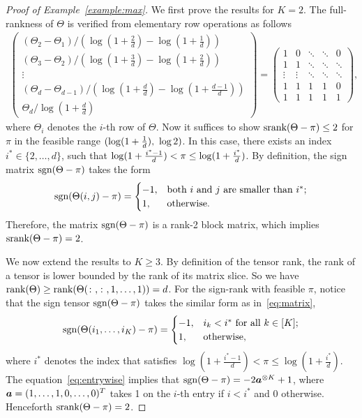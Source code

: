 \documentclass[twoside,11pt]{article}
\theoremstyle{definition}
\def\sign{\textup{sgn}}
\def\srank{\textup{srank}}
\def\rank{\textup{rank}}
\begin{document}
\begin{proof}[Proof of Example~\ref{example:max}]
We first prove the results for $K=2$. The full-rankness of $\Theta$ is verified from elementary row operations as follows
\begin{align}
\begin{pmatrix}
(\Theta_2-\Theta_1)/(\log(1+\frac{2}{d})-\log(1+\frac{1}{d}))\\(\Theta_3-\Theta_2)/(\log(1+\frac{3}{d})-\log(1+\frac{2}{d}))\\\vdots\\ (\Theta_d-\Theta_{d-1})/(\log(1+\frac{d}{d})-\log(1+\frac{d-1}{d}))\\\Theta_d/\log(1+\frac{d}{d})
\end{pmatrix} = \begin{pmatrix}
 1&          0  &      \ddots  &        \ddots       &          0 \\
1& 1 & \ddots &            \ddots   &   \ddots          \\
      \vdots &     \vdots & \ddots &       \ddots &    \ddots         \\
 1 & 1 &1 & 1 &0\\
 1 & 1 &1 & 1 &1
\end{pmatrix},
\end{align}
where $\Theta_i$ denotes the $i$-th row of $\Theta$. 
Now it suffices to show $\srank(\Theta-\pi)\leq 2$ for $\pi$ in the feasible range $(\log(1+{1\over d}),\ \log 2)$. In this case, there exists an index $i^*\in\{2,\ldots,d\}$, such that $\log(1+{i^*-1\over d})< \pi\leq \log(1+{i^*\over d})$. By definition, the sign matrix $\sign (\Theta-\pi)$ takes the form
\begin{equation}\label{eq:matrix}
\sign (\Theta(i,j)-\pi)=
\begin{cases}
-1, & \text{both $i$ and $j$ are smaller than $i^*$};\\
1, & \text{otherwise}.
\end{cases}
\end{equation}
Therefore, the matrix $\sign (\Theta-\pi)$ is a rank-2 block matrix, which implies $\srank(\Theta-\pi)=2$. 

We now extend the results to $K\geq 3$. By definition of the tensor rank, the rank of a tensor is lower bounded by the rank of its matrix slice.  So we have $\rank(\Theta)\geq \rank(\Theta(\colon,\colon,1,\ldots,1))=d$. For the sign-rank with feasible $\pi$, notice that the sign tensor $\sign(\Theta-\pi)$ takes the similar form as in~\eqref{eq:matrix},
\begin{equation}\label{eq:entrywise}
\sign (\Theta(i_1,\ldots,i_K)-\pi)=
\begin{cases}
-1, & \text{$i_k<i^*$ for all $k\in[K]$};\\
1, & \text{otherwise},
\end{cases}
\end{equation}
where $i^*$ denotes the index that satisfies $\log(1+\frac{i^*-1}{d})<\pi\leq \log(1+\frac{i^*}{d})$.
The equation~\eqref{eq:entrywise} implies that $\sign(\Theta-\pi)=-2\ma^{\otimes K}+1$, where $\bm{a}=(1,\ldots,1,0,\ldots,0)^T$ takes 1 on the $i$-th entry if $i<i^*$ and 0 otherwise. Henceforth $\srank(\Theta-\pi)=2$. 
\end{proof}
\end{document}
